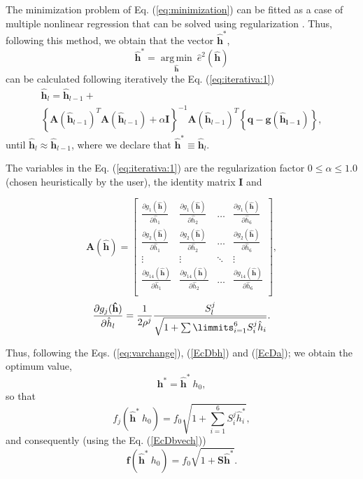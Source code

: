 \documentclass[11pt,twocolumn]{article}
\newcommand{\DERPAR}[4]{\frac{\partial #1_{#3}(\mathbf{\hat{#2}})}{ \partial \hat{#2}_{#4}}}
\begin{document}
The minimization problem of Eq. (\ref{eq:minimization}) can be fitted as a case of multiple nonlinear regression 
that can be solved using regularization 
\cite[pp. 129]{pujaicoriverafernando2020}. 
Thus, following this method, we obtain that the vector $\mathbf{\hat{h}}^{*}$, 
\begin{equation}
\mathbf{\hat{h}}^{*}= \underset{\mathbf{\hat{h}}}{\operatorname {arg\,min}}~\hat{e}^2(\mathbf{\hat{h}})
\end{equation}
can be calculated following iteratively the Eq. (\ref{eq:iterativa:1}) 
\small
\begin{equation}\label{eq:iterativa:1}
\begin{array}{l}
\mathbf{\hat{h}}_{l} = \mathbf{\hat{h}}_{l-1}+\\ 
\left\{\mathbf{A}(\mathbf{\hat{h}}_{l-1})^{T} \mathbf{A}(\mathbf{\hat{h}}_{l-1})+\alpha \mathbf{I}\right\}^{-1}
\mathbf{A}(\mathbf{\hat{h}}_{l-1})^{T} \left\{\mathbf{q}-\mathbf{g}(\mathbf{\hat{h}_{l-1}})\right\},
\end{array}
\end{equation}
\normalsize
until $\mathbf{\hat{h}}_{l} \approx \mathbf{\hat{h}}_{l-1}$,
where we declare that $\mathbf{\hat{h}}^{*} \equiv \mathbf{\hat{h}}_{l}$. 

The variables in the Eq. (\ref{eq:iterativa:1}) are the regularization factor $0 \leq \alpha \leq 1.0$ 
(chosen heuristically  by the user), the identity matrix $\mathbf{I}$ and

\begin{equation}
\mathbf{A}(\mathbf{\hat{h}})=
\left[
\begin{matrix}
\DERPAR{g}{h}{1}{1} & \DERPAR{g}{h}{1}{2} & \hdots & \DERPAR{g}{h}{1}{6} \\ 
\DERPAR{g}{h}{2}{1} & \DERPAR{g}{h}{2}{2} & \hdots & \DERPAR{g}{h}{2}{6} \\
\vdots & \vdots & \ddots & \vdots \\ 
\DERPAR{g}{h}{14}{1} & \DERPAR{g}{h}{14}{2} & \hdots & \DERPAR{g}{h}{14}{6} \\
\end{matrix}
\right],
\end{equation}
\begin{equation}
\DERPAR{g}{h}{j}{l}=
\frac{1}{2 \rho^j}\frac{S_{l}^{j}}{\sqrt{1+\sum\limmits_{i=1}^{6} S_{i}^{j} \hat{h}_i}}.
\end{equation}

Thus, following the Eqs. (\ref{eq:varchange}), (\ref{EcDbh}) and (\ref{EcDa}); we obtain the optimum value,
\begin{equation} \label{eq:optimalh}
\mathbf{h}^* = \mathbf{\hat{h}^*}~h_0,
\end{equation}
so that
\begin{equation} \label{EcDbhath}
f_j(\mathbf{\hat{h}^*}~h_0) = f_0 \sqrt{1 +\sum_{i=1}^{6}{S^{j}_{i} \hat{h}^*_i}},
\end{equation}
and consequently (using the Eq. (\ref{EcDbvech}))
\begin{equation} \label{EcDbhathvec}
\mathbf{f}(\mathbf{\hat{h}^*}~h_0)= f_0 \sqrt{1 +\mathbf{S} \mathbf{\hat{h}^*}}.
\end{equation}
\end{document}
